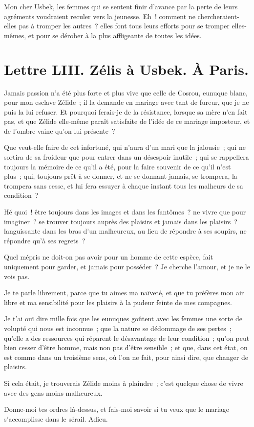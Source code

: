 \documentclass[french,twoside]{book} %
\newcommand{\dateline}[1]{\medskip{\RaggedLeft{#1}\par}\bigskip}
\begin{document}
Mon cher Usbek, les femmes qui se sentent finir d’avance par la perte de leurs agréments voudraient reculer vers la jeunesse. Eh ! comment ne chercheraient-elles pas à tromper les autres ? elles font tous leurs efforts pour se tromper elles-mêmes, et pour se dérober à la plus affligeante de toutes les idées.\par

\dateline{À Paris, le 3 de la lune de Chalval, 1713.}
\section[{Lettre LIII. Zélis à Usbek. À Paris.}]{Lettre LIII. Zélis à Usbek. À Paris.}\renewcommand{\leftmark}{Lettre LIII. Zélis à Usbek. À Paris.}

\noindent Jamais passion n’a été plus forte et plus vive que celle de Cosrou, eunuque blanc, pour mon esclave Zélide ; il la demande en mariage avec tant de fureur, que je ne puis la lui refuser. Et pourquoi ferais-je de la résistance, lorsque sa mère n’en fait pas, et que Zélide elle-même paraît satisfaite de l’idée de ce mariage imposteur, et de l’ombre vaine qu’on lui présente ?\par
Que veut-elle faire de cet infortuné, qui n’aura d’un mari que la jalousie ; qui ne sortira de sa froideur que pour entrer dans un désespoir inutile ; qui se rappellera toujours la mémoire de ce qu’il a été, pour la faire souvenir de ce qu’il n’est plus ; qui, toujours prêt à se donner, et ne se donnant jamais, se trompera, la trompera sans cesse, et lui fera essuyer à chaque instant tous les malheurs de sa condition ?\par
Hé quoi ! être toujours dans les images et dans les fantômes ? ne vivre que pour imaginer ? se trouver toujours auprès des plaisirs et jamais dans les plaisirs ? languissante dans les bras d’un malheureux, au lieu de répondre à ses soupirs, ne répondre qu’à ses regrets ?\par
Quel mépris ne doit-on pas avoir pour un homme de cette espèce, fait uniquement pour garder, et jamais pour posséder ? Je cherche l’amour, et je ne le vois pas.\par
Je te parle librement, parce que tu aimes ma naïveté, et que tu préfères mon air libre et ma sensibilité pour les plaisirs à la pudeur feinte de mes compagnes.\par
Je t’ai ouï dire mille fois que les eunuques goûtent avec les femmes une sorte de volupté qui nous est inconnue ; que la nature se dédommage de ses pertes ; qu’elle a des ressources qui réparent le désavantage de leur condition ; qu’on peut bien cesser d’être homme, mais non pas d’être sensible ; et que, dans cet état, on est comme dans un troisième sens, où l’on ne fait, pour ainsi dire, que changer de plaisirs.\par
Si cela était, je trouverais Zélide moins à plaindre ; c’est quelque chose de vivre avec des gens moins malheureux.\par
Donne-moi tes ordres là-dessus, et fais-moi savoir si tu veux que le mariage s’accomplisse dans le sérail. Adieu.\par
\end{document}
